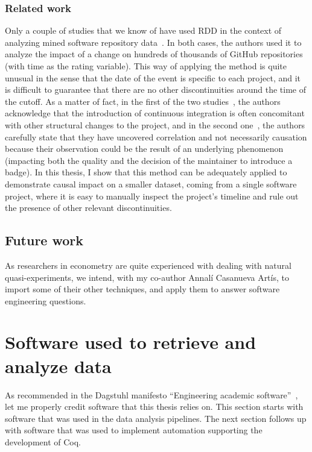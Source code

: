 \subsubsection{Related work}

Only a couple of studies that we know of have used RDD in the context of analyzing mined software repository data~\cite{zhao2017impact,trockman2018adding}.
In both cases, the authors used it to analyze the impact of a change on hundreds of thousands of GitHub repositories (with time as the rating variable).
This way of applying the method is quite unusual in the sense that the date of the event is specific to each project, and it is difficult to guarantee that there are no other discontinuities around the time of the cutoff.
As a matter of fact, in the first of the two studies~\cite{zhao2017impact}, the authors acknowledge that the introduction of continuous integration is often concomitant with other structural changes to the project, and in the second one~\cite{trockman2018adding}, the authors carefully state that they have uncovered correlation and not necessarily causation because their observation could be the result of an underlying phenomenon (impacting both the quality and the decision of the maintainer to introduce a badge).
In this thesis, I show that this method can be adequately applied to demonstrate causal impact on a smaller dataset, coming from a single software project, where it is easy to manually inspect the project's timeline and rule out the presence of other relevant discontinuities.

\subsection{Future work}

As researchers in econometry are quite experienced with dealing with natural quasi-experiments, we intend, with my co-author Annal\'i Casanueva Art\'is, to import some of their other techniques, and apply them to answer software engineering questions.

\section{Software used to retrieve and analyze data}

\label{sec:data-mining-software}

As recommended in the Dagstuhl manifesto ``Engineering academic software''~\cite{allen2017engineering}, let me properly credit software that this thesis relies on.
This section starts with software that was used in the data analysis pipelines.
The next section follows up with software that was used to implement automation supporting the development of Coq.

